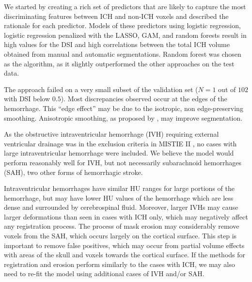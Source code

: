 \documentclass{elsarticle_nonatbib}\usepackage[]{graphicx}\usepackage[]{color}
\begin{document}
We started by creating a rich set of predictors that are likely to capture the most discriminating features between ICH and non-ICH voxels and described the rationale for each predictor.  Models of these predictors using logistic regression, logistic regression penalized with the LASSO, GAM, and random forests result in high values for the DSI and high correlations between the total ICH volume obtained from manual and automatic segmentations.  Random forest was chosen as the algorithm, as it slightly outperformed the other approaches on the test data.


The approach failed on a very small subset of the validation set ($N = 1$ out of $102$ with DSI below $0.5$). Most discrepancies observed occur at the edges of the hemorrhage.  This ``edge effect'' may be due to the isotropic, non edge-preserving smoothing.  Anisotropic smoothing, as proposed by \citet{perona1994anisotropic}, may improve segmentation.

As the obstructive intraventricular hemorrhage (IVH) requiring external ventricular drainage was in the exclusion criteria in MISTIE II \citep{mould_minimally_2013}, no cases with large intraventricular hemorrhage were included.  We believe the model would perform reasonably well for IVH, but not necessarily subarachnoid hemorrhages (SAH), two other forms of hemorrhagic stroke.  

Intraventricular hemorrhages have similar HU ranges for large portions of the hemorrhage, but may have lower HU values of the hemorrhage which are less dense and surrounded by cerebrospinal fluid.  Moreover, larger IVHs may cause larger deformations than seen in cases with ICH only, which may negatively affect any registration process. The process of mask erosion may considerably remove voxels from the SAH, which occurs largely on the cortical surface.  This step is important to remove false positives, which may occur from partial volume effects with areas of the skull and voxels towards the cortical surface. If the methods for registration and erosion perform similarly to the cases with ICH, we may also need to re-fit the model using additional cases of IVH and/or SAH.
\end{document}

